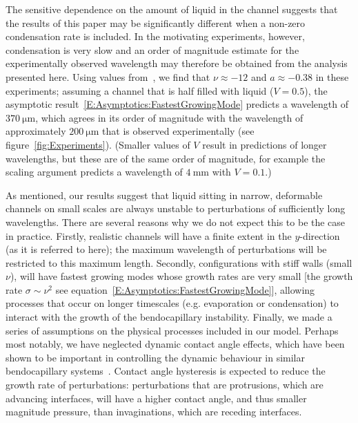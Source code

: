 \documentclass{jfm}
\newcommand{\aspect}{a} %
\begin{document}

The sensitive dependence on the amount of liquid in the channel suggests that the results of this paper may be significantly different when a non-zero condensation rate is included. In the motivating experiments, however, condensation is very slow and an order of magnitude estimate for the experimentally observed wavelength may therefore be obtained from the analysis presented here. Using values from~\cite{Seemann2011JPhysCondMat}, we find that $\nu \approx -12$ and $\aspect \approx -0.38$ in these experiments; assuming a channel that is half filled with liquid ($V = 0.5$), the asymptotic result~\eqref{E:Asymptotics:FastestGrowingMode} predicts a wavelength of $370~\si{\micro \meter}$, which agrees in its order of magnitude with the wavelength of approximately $200~\si{\micro \meter}$ that is observed experimentally (see figure~\ref{fig:Experiments}). (Smaller values of $V$ result in predictions of longer wavelengths, but these are of the same order of magnitude, for example the scaling argument predicts a wavelength of $4~\si{\milli \meter}$ with $V = 0.1$.) 

As mentioned, our results suggest that liquid sitting in narrow, deformable channels on small scales are always unstable to perturbations of sufficiently long wavelengths. There are several reasons why we do not expect this to be the case in practice. Firstly, realistic channels will have a finite extent in the $y$-direction (as it is referred to here); the maximum wavelength of perturbations will be restricted to this maximum length. Secondly, configurations with stiff walls (small $\nu$), will have fastest growing modes whose growth rates are very small [the growth rate $\sigma \sim \nu^2$ see equation~\eqref{E:Asymptotics:FastestGrowingMode}], allowing processes that occur on longer timescales (e.g. evaporation or condensation) to interact with the growth of the bendocapillary instability. Finally, we made a series of assumptions on the physical processes included in our model. Perhaps most notably, we have neglected dynamic contact angle effects, which have been shown to be important in controlling the dynamic behaviour in similar bendocapillary systems~\citep[e.g][]{Bradley2021PRF}. Contact angle hysteresis is expected to reduce the growth rate of perturbations: perturbations that are protrusions, which are advancing interfaces, will have a higher contact angle, and thus smaller magnitude pressure, than invaginations, which are receding interfaces.
\end{document}
